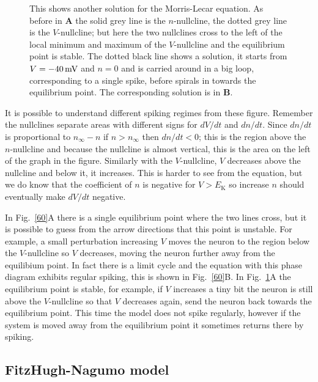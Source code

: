 \documentclass[11pt,a4paper]{scrartcl}
\newcommand{\mV}{\mbox{\,mV}}
\begin{document}
\begin{figure}
\begin{center}

\end{center}
\caption{This shows another solution for the Morris-Lecar equation. As before in \textbf{A} the solid grey line is the
  $n$-nullcline, the dotted grey line is the $V$-nullcline; but here the two
  nullclines cross to the left of the local minimum and maximum of the
  $V$-nullcline and the equilibrium point is stable. The dotted
  black line shows a solution, it starts from $V=-40\mV$ and $n=0$ and
  is carried around in a big loop, corresponding to a single spike, before spirals in towards the equilibrium point. The corresponding solution is in
  \textbf{B}.  \label{40}}
\end{figure}


It is possible to understand different spiking regimes from these
figure. Remember the nullclines separate areas with different signs
for $dV/dt$ and $dn/dt$. Since $dn/dt$ is proportional to $n_\infty-n$
if $n>n_\infty$ then $dn/dt<0$; this is the region above the
$n$-nullcline and because the nullcline is almost vertical, this is
the area on the left of the graph in the figure. Similarly with the
$V$-nullcline, $V$ decreases above the nullcline and below it, it
increases. This is harder to see from the equation, but we do know
that the coefficient of $n$ is negative for $V>E_{\text{K}}$ so increase $n$
should eventually make $dV/dt$ negative.

In Fig.~\ref{60}A there is a single equilibrium point where the two
lines cross, but it is possible to guess from the arrow directions
that this point is unstable. For example, a small perturbation
increasing $V$ moves the neuron to the region below the $V$-nullcline
so $V$ decreases, moving the neuron further away from the equilibium
point. In fact there is a limit cycle and the equation with this phase
diagram exhibits regular spiking, this is shown in Fig.~\ref{60}B. In
Fig.~\ref{40}A the equilibrium point is stable, for example, if $V$
increases a tiny bit the neuron is still above the $V$-nullcline so
that $V$ decreases again, send the neuron back towards the equilibrium
point. This time the model does not spike regularly, however if the
system is moved away from the equilibrium point it sometimes returns
there by spiking.

\subsection*{FitzHugh-Nagumo model}
\end{document}
